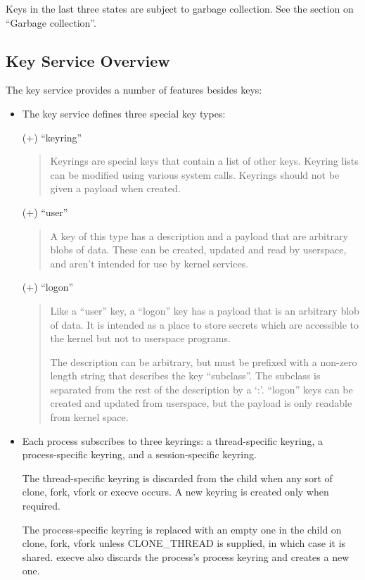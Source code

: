 \documentclass[a4paper,8pt,english]{sphinxmanual}
\begin{document}
Keys in the last three states are subject to garbage collection.  See the
section on ``Garbage collection''.


\subsection{Key Service Overview}
\label{security/keys/core:key-service-overview}
The key service provides a number of features besides keys:
\begin{itemize}
\item {} 
The key service defines three special key types:

(+) ``keyring''
\begin{quote}

Keyrings are special keys that contain a list of other keys. Keyring
lists can be modified using various system calls. Keyrings should not
be given a payload when created.
\end{quote}

(+) ``user''
\begin{quote}

A key of this type has a description and a payload that are arbitrary
blobs of data. These can be created, updated and read by userspace,
and aren't intended for use by kernel services.
\end{quote}

(+) ``logon''
\begin{quote}

Like a ``user'' key, a ``logon'' key has a payload that is an arbitrary
blob of data. It is intended as a place to store secrets which are
accessible to the kernel but not to userspace programs.

The description can be arbitrary, but must be prefixed with a non-zero
length string that describes the key ``subclass''. The subclass is
separated from the rest of the description by a `:'. ``logon'' keys can
be created and updated from userspace, but the payload is only
readable from kernel space.
\end{quote}

\item {} 
Each process subscribes to three keyrings: a thread-specific keyring, a
process-specific keyring, and a session-specific keyring.

The thread-specific keyring is discarded from the child when any sort of
clone, fork, vfork or execve occurs. A new keyring is created only when
required.

The process-specific keyring is replaced with an empty one in the child on
clone, fork, vfork unless CLONE\_THREAD is supplied, in which case it is
shared. execve also discards the process's process keyring and creates a
new one.


\end{itemize}
\end{document}
